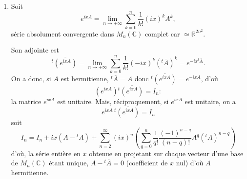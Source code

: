 \begin{enumerate}[label=\arabic*.,leftmargin=2.2em,itemsep=1.15em]
Soit alors $v\in H$, essayons de « résoudre » l'équation $v=\varphi(u)$.

Si $u$ est tel que $v=i(\operatorname{id}+u)(\operatorname{id}-u)^{-1}$, on aurait $v(\operatorname{id}-u)=i(\operatorname{id}+u)$ d'où $v-i\operatorname{id}=(v+i\operatorname{id})u$ et si $v+i\operatorname{id}$ est inversible, on aurait
\[
u=(v-i\operatorname{id})(v+i\operatorname{id})^{-1}.
\]
Or, si $v+i\operatorname{id}$ est non inversible c'est qu'il existe $x$ non nul tel que $v(x)=-ix$ mais alors on a
\[
\left(\frac1{2i}(v-v^*)(x),x\right)
=-\frac1{2i}\bigl((v(x),x)-(v^*(x),x)\bigr)
=-\|x\|^2,
\]
ce qui contredit l'hypothèse $\frac1{2i}(v-v^*)$ définie positive puisque $v\in H$.

Finalement, pour tout $v$ de $H$, il existe un et un seul $u$ de $L(E)$,
\[
u=(v-i\operatorname{id})(v+i\operatorname{id})^{-1},
\]
tel que $\varphi(u)=v$.

\emph{Si on prouve que ce $u$ est dans $D$, on aura bien $\varphi$ bijection de $D$ sur $H$.}

Soit donc $u=(v-i\operatorname{id})(v+i\operatorname{id})^{-1}$, a-t-on $\operatorname{id}-u^*u$ définie positive, c'est-à-dire, pour tout $x$ non nul de $E$,
\[
(x,x-u^*u(x))=\|x\|^2-\|u(x)\|^2>0?
\]
On pose $y=(v+i\operatorname{id})^{-1}(x)$, donc $x=(v+i\operatorname{id})(y)$ et il suffit de prouver que, $\forall y\ne0$,
\[
\|(v+i\operatorname{id})(y)\|^2-\|(v-i\operatorname{id})(y)\|^2>0,
\]
soit
\[
(v(y)+iy,v(y)+iy)-(v(y)-iy,v(y)-iy)>0,
\]
soit, après développement :
\[
-2i(y,v(y))+2i(v(y),y)>0.
\]
Cette expression, c'est encore :
\[
\begin{aligned}
B&=2i((y,v^*(y))-(y,v(y)))=2i((y,(v^*-v)(y)))\\
&=(y,2i(v^*-v)(y))
=4\left(y,\frac1{2i}(v-v^*)(y)\right),
\end{aligned}
\]
ce qui est bien $>0$ puisque $\frac{v-v^*}{2i}$ est définie positive.

\item Soit
\[
e^{ixA}=\lim_{n\to+\infty}\sum_{k=0}^n\frac1{k!}(ix)^kA^k,
\]
série absolument convergente dans $M_n(\mathbb C)$ complet car $\simeq\mathbb R^{2n^2}$.

Son adjointe est
\[
{}^t\!\overline{(e^{ixA})}
=\lim_{n\to+\infty}\sum_{k=0}^n\frac1{k!}(-ix)^k({}^t\!\overline A)^k
=e^{-ix{}^t\!\overline A}.
\]
On a donc, si $A$ est hermitienne, ${}^t\!\overline A=A$ donc ${}^t\!\overline{(e^{ixA})}=e^{-ixA}$, d'où
\[
(e^{ixA}){}^t\!\overline{(e^{ixA})}=I_n :
\]
la matrice $e^{ixA}$ est unitaire. Mais, réciproquement, si $e^{ixA}$ est unitaire, on a
\[
e^{ixA}\,{}^t\!\overline{(e^{ixA})}=I_n
\]
soit
\[
I_n=I_n+ix(A-{}^t\!\overline A)+\sum_{n=2}^{\infty}(ix)^n\left(\sum_{q=0}^n\frac1{q!}\frac{(-1)^{n-q}}{(n-q)!}A^q({}^t\!\overline A)^{n-q}\right)
\]
d'où, la série entière en $x$ obtenue en projetant sur chaque vecteur d'une base de $M_n(\mathbb C)$ étant unique, $A-{}^t\!\overline A=0$ (coefficient de $x$ nul) d'où $A$ hermitienne.


\end{enumerate}
